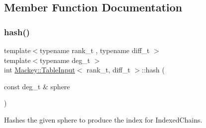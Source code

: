 \subsection{Member Function Documentation}
\mbox{\label{classMackey_1_1TableInput_a277a59b7c30aa21e37c0ed7f187552cd}} 
\subsubsection{\texorpdfstring{hash()}{hash()}}
{\footnotesize\ttfamily template$<$typename rank\+\_\+t , typename diff\+\_\+t $>$ \\
template$<$typename deg\+\_\+t $>$ \\
int \hyperlink{classMackey_1_1TableInput}{Mackey\+::\+Table\+Input}$<$ rank\+\_\+t, diff\+\_\+t $>$\+::hash (\begin{DoxyParamCaption}\item[{const deg\+\_\+t \&}]{sphere }\end{DoxyParamCaption})\hspace{0.3cm}{\ttfamily [protected]}}



Hashes the given sphere to produce the index for Indexed\+Chains. 

